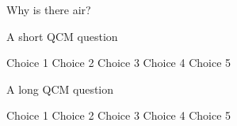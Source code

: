 \documentclass[french]{ecamexam}
\begin{document}

\makecover


\begin{questions}
	\question Why is there air?
	
\end{questions}



\begin{questions}
	\question[2] A short QCM question
	
	\begin{oneparchoices}
		\choice Choice 1
		\choice Choice 2
		\choice Choice 3
		\choice Choice 4
		\choice Choice 5
	\end{oneparchoices}
	
	\question A long QCM question
	
	\begin{choices}
		\choice Choice 1
		\choice Choice 2
		\choice Choice 3
		\choice Choice 4
		\choice Choice 5
	\end{choices}
\end{questions}
\newpage
\end{document}
